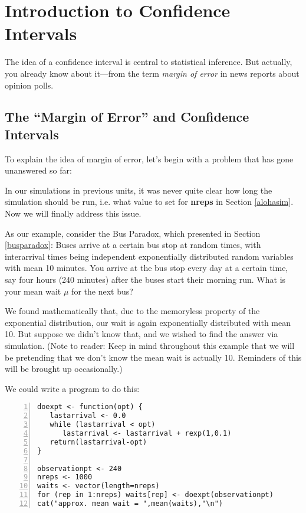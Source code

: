 \chapter{Introduction to Confidence Intervals} 
\label{chap:confints} 

The idea of a confidence interval is central to statistical inference.
But actually, you already know about it---from the term {\it margin of
error} in news reports about opinion polls.
 
\section{The ``Margin of Error'' and Confidence Intervals}
\label{ciintro}

To explain the idea of margin of error, let's begin with a problem that
has gone unanswered so far:

In our simulations in previous units, it was never quite clear how long
the simulation should be run, i.e. what value to set for {\bf nreps} in
Section \ref{alohasim}.  Now we will finally address this issue.

As our example, consider the Bus Paradox, which presented in
Section \ref{busparadox}:  Buses arrive at a certain bus stop at random
times, with interarrival times being independent exponentially
distributed random variables with mean 10 minutes.  You arrive at the
bus stop every day at a certain time, say four hours (240 minutes) after
the buses start their morning run.  What is your mean wait $\mu$ for the
next bus?  

We found mathematically that, due to the memoryless property of the
exponential distribution, our wait is again exponentially distributed
with mean 10.  But suppose we didn't know that, and we wished to find
the answer via simulation.  (Note to reader:  Keep in mind throughout 
this example that we will be pretending that we don't know the 
mean wait is actually 10.  Reminders of this will be brought up
occasionally.)

We could write a program to do this:

\begin{Verbatim}[fontsize=\relsize{-2},numbers=left]
doexpt <- function(opt) {
   lastarrival <- 0.0
   while (lastarrival < opt) 
      lastarrival <- lastarrival + rexp(1,0.1)
   return(lastarrival-opt)
}

observationpt <- 240
nreps <- 1000
waits <- vector(length=nreps)
for (rep in 1:nreps) waits[rep] <- doexpt(observationpt)
cat("approx. mean wait = ",mean(waits),"\n")
\end{Verbatim}

